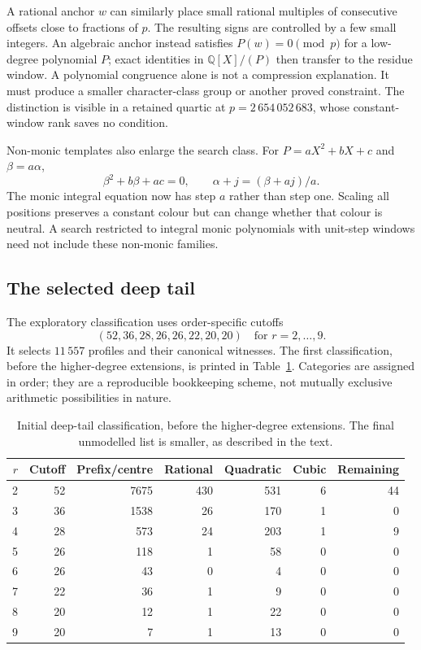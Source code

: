 \documentclass[11pt]{article}
\theoremstyle{definition}\newtheorem{definition}[theorem]{Definition}
\newcommand{\Q}{\mathbb Q}
\begin{document}
A rational anchor $w$ can similarly place small rational multiples of
consecutive offsets close to fractions of $p$. The resulting signs are
controlled by a few small integers. An algebraic anchor instead
satisfies $P(w)=0\pmod p$ for a low-degree polynomial $P$; exact
identities in $\Q[X]/(P)$ then transfer to the residue window.
A polynomial congruence alone is not a compression explanation. It
must produce a smaller character-class group or another proved
constraint. The distinction is visible in a retained quartic at
$p=2\,654\,052\,683$, whose constant-window rank saves no condition.

Non-monic templates also enlarge the search class. For
$P=aX^2+bX+c$ and $\beta=a\alpha$,
\[
 \beta^2+b\beta+ac=0,\qquad
 \alpha+j=(\beta+aj)/a.
\]
The monic integral equation now has step $a$ rather than step one.
Scaling all positions preserves a constant colour but can change
whether that colour is neutral. A search restricted to integral
monic polynomials with unit-step windows need not include these
non-monic families.


\subsection{The selected deep tail}
The exploratory classification uses order-specific cutoffs
\[
 (52,36,28,26,26,22,20,20)\quad\text{for }r=2,\ldots,9.
\]
It selects $11\,557$ profiles and their canonical witnesses. The
first classification, before the higher-degree extensions, is printed
in Table~\ref{tab:classification}. Categories are assigned in order;
they are a reproducible bookkeeping scheme, not mutually exclusive
arithmetic possibilities in nature.
\begin{table}[htbp]\centering\small\setlength{\tabcolsep}{4pt}
\caption{Initial deep-tail classification, before the higher-degree extensions. The final unmodelled list is smaller, as described in the text.}\label{tab:classification}
\begin{tabular}{rrrrrrr}
\toprule
$r$ & Cutoff & Prefix/centre & Rational & Quadratic & Cubic & Remaining \\
\midrule
2 & 52 & 7675 & 430 & 531 & 6 & 44 \\
3 & 36 & 1538 & 26 & 170 & 1 & 0 \\
4 & 28 & 573 & 24 & 203 & 1 & 9 \\
5 & 26 & 118 & 1 & 58 & 0 & 0 \\
6 & 26 & 43 & 0 & 4 & 0 & 0 \\
7 & 22 & 36 & 1 & 9 & 0 & 0 \\
8 & 20 & 12 & 1 & 22 & 0 & 0 \\
9 & 20 & 7 & 1 & 13 & 0 & 0 \\
\bottomrule\end{tabular}\end{table}
\end{document}
